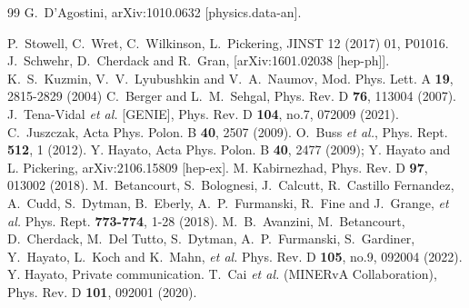 \begin{thebibliography}{99}
  G.~D'Agostini,
  arXiv:1010.0632 [physics.data-an].
%

%
P.~Stowell, C.~Wret, C.~Wilkinson, L.~Pickering, JINST 12 (2017) 01, P01016.
%
J.~Schwehr, D.~Cherdack and R.~Gran,
[arXiv:1601.02038 [hep-ph]].
%
K.~S.~Kuzmin, V.~V.~Lyubushkin and V.~A.~Naumov,
Mod. Phys. Lett. A \textbf{19}, 2815-2829 (2004)
%
C.~Berger and L.~M.~Sehgal, Phys. Rev. D \textbf{76}, 113004 (2007).
J.~Tena-Vidal \textit{et al.} [GENIE],
Phys. Rev. D \textbf{104}, no.7, 072009 (2021).
%
C.~Juszczak, Acta Phys. Polon. B {\bf 40}, 2507 (2009).
%
%
O.~Buss {\it et al.}, Phys. Rept. {\bf 512}, 1 (2012). 
%
 Y. Hayato, Acta Phys. Polon. B {\bf 40}, 2477 (2009); Y. Hayato and L. Pickering, arXiv:2106.15809 [hep-ex].
%
 M. Kabirnezhad, Phys. Rev. D \textbf{97}, 013002 (2018).
%
M.~Betancourt, S.~Bolognesi, J.~Calcutt, R.~Castillo Fernandez, A.~Cudd, S.~Dytman, B.~Eberly, A.~P.~Furmanski, R.~Fine and J.~Grange, \textit{et al.}
Phys. Rept. \textbf{773-774}, 1-28 (2018).
%
M.~B.~Avanzini, M.~Betancourt, D.~Cherdack, M.~Del Tutto, S.~Dytman, A.~P.~Furmanski, S.~Gardiner, Y.~Hayato, L.~Koch and K.~Mahn, \textit{et al.}
Phys. Rev. D \textbf{105}, no.9, 092004 (2022).
%
%
 Y. Hayato, Private communication.
%
T.~Cai {\it et al.} (MINERvA Collaboration), Phys. Rev. D \textbf{101}, 092001 (2020).



\end{thebibliography}
